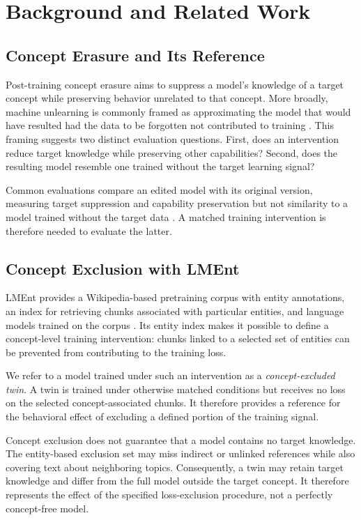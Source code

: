 \section{Background and Related Work}
\label{sec:related-work}

\subsection{Concept Erasure and Its Reference}

Post-training concept erasure aims to suppress a model's knowledge of a target
concept while preserving behavior unrelated to that concept. More broadly,
machine unlearning is commonly framed as approximating the model that would
have resulted had the data to be forgotten not contributed to training
\citep{wichert2024rethinking}. This framing suggests two distinct evaluation
questions. First, does an intervention reduce target knowledge while
preserving other capabilities? Second, does the resulting model resemble one
trained without the target learning signal?

Common evaluations compare an edited model with its original version, measuring
target suppression and capability preservation but not similarity to a model
trained without the target data \citep{yao2024machineunlearning,li2024wmdp}.
A matched training intervention is therefore needed to evaluate the latter.

\subsection{Concept Exclusion with LMEnt}

LMEnt provides a Wikipedia-based pretraining corpus with entity annotations,
an index for retrieving chunks associated with particular entities, and
language models trained on the corpus \citep{gottesman2025lment}. Its entity
index makes it possible to define a concept-level training intervention:
chunks linked to a selected set of entities can be prevented from contributing
to the training loss.

We refer to a model trained under such an intervention as a
\emph{concept-excluded twin}. A twin is trained under otherwise matched
conditions but receives no loss on the selected concept-associated chunks. It
therefore provides a reference for the behavioral effect of excluding a
defined portion of the training signal.

Concept exclusion does not guarantee that a model contains no target
knowledge. The entity-based exclusion set may miss indirect or unlinked
references while also covering text about neighboring topics. Consequently,
a twin may retain target knowledge and differ from the full model outside the
target concept. It therefore represents the effect of the specified
loss-exclusion procedure, not a perfectly concept-free model.

